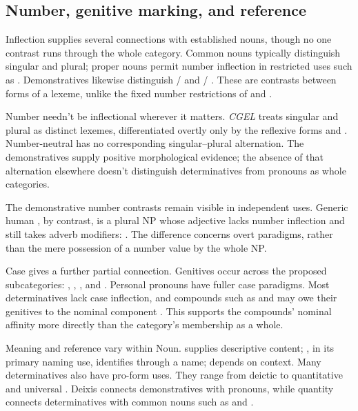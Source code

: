 \documentclass[12pt]{article}
\begin{document}
\subsection{Number, genitive marking, and reference}\label{sec:inflection}

Inflection supplies several connections with established nouns, though no one contrast runs through the whole category. Common nouns typically distinguish singular and plural; proper nouns permit number inflection in restricted uses such as . Demonstratives likewise distinguish / and / \citep[373, 521]{huddleston2002}. These are contrasts between forms of a lexeme, unlike the fixed number restrictions of  and .

Number needn't be inflectional wherever it matters. \textit{CGEL} treats singular and plural  as distinct lexemes, differentiated overtly only by the reflexive forms  and  \citep[486]{huddleston2002}. Number-neutral  has no corresponding singular--plural alternation. The demonstratives supply positive morphological evidence; the absence of that alternation elsewhere doesn't distinguish determinatives from pronouns as whole categories.

The demonstrative number contrasts remain visible in independent uses. Generic human , by contrast, is a plural NP whose adjective lacks number inflection and still takes adverb modifiers:  \citep[418]{huddleston2002}. The difference concerns overt paradigms, rather than the mere possession of a number value by the whole NP.

Case gives a further partial connection. Genitives occur across the proposed subcategories: , , , and . Personal pronouns have fuller case paradigms. Most determinatives lack case inflection, and compounds such as  and  may owe their genitives to the nominal component \citep[423--424, 479--480]{huddleston2002}. This supports the compounds' nominal affinity more directly than the category's membership as a whole.

Meaning and reference vary within Noun.  supplies descriptive content; , in its primary naming use, identifies through a name;  depends on context. Many determinatives also have pro-form uses. They range from deictic  to quantitative  and universal  \citep[358--360, 370--405, 425--428, 515--521]{huddleston2002}. Deixis connects demonstratives with pronouns, while quantity connects determinatives with common nouns such as  and .
\end{document}
